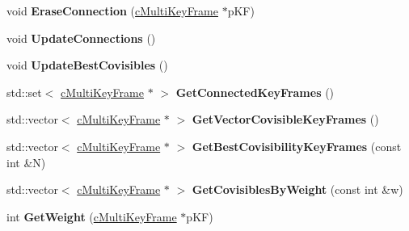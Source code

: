 \begin{DoxyCompactItemize}
\item 
void {\bfseries Erase\+Connection} (\hyperlink{classMultiColSLAM_1_1cMultiKeyFrame}{c\+Multi\+Key\+Frame} $\ast$p\+KF)\hypertarget{classMultiColSLAM_1_1cMultiKeyFrame_af24a02f8718683276af1d08dceff3ba0}{}\label{classMultiColSLAM_1_1cMultiKeyFrame_af24a02f8718683276af1d08dceff3ba0}

\item 
void {\bfseries Update\+Connections} ()\hypertarget{classMultiColSLAM_1_1cMultiKeyFrame_a8b468d98f7e5eaf1b6d1ed23d82f7550}{}\label{classMultiColSLAM_1_1cMultiKeyFrame_a8b468d98f7e5eaf1b6d1ed23d82f7550}

\item 
void {\bfseries Update\+Best\+Covisibles} ()\hypertarget{classMultiColSLAM_1_1cMultiKeyFrame_a7e8be04b50f3972f16278ae5e69be13c}{}\label{classMultiColSLAM_1_1cMultiKeyFrame_a7e8be04b50f3972f16278ae5e69be13c}

\item 
std\+::set$<$ \hyperlink{classMultiColSLAM_1_1cMultiKeyFrame}{c\+Multi\+Key\+Frame} $\ast$ $>$ {\bfseries Get\+Connected\+Key\+Frames} ()\hypertarget{classMultiColSLAM_1_1cMultiKeyFrame_a98bb50a395b13972fee7483eb428f7c7}{}\label{classMultiColSLAM_1_1cMultiKeyFrame_a98bb50a395b13972fee7483eb428f7c7}

\item 
std\+::vector$<$ \hyperlink{classMultiColSLAM_1_1cMultiKeyFrame}{c\+Multi\+Key\+Frame} $\ast$ $>$ {\bfseries Get\+Vector\+Covisible\+Key\+Frames} ()\hypertarget{classMultiColSLAM_1_1cMultiKeyFrame_abb15651bcb2f8ea2b5a37d92b3b8cd56}{}\label{classMultiColSLAM_1_1cMultiKeyFrame_abb15651bcb2f8ea2b5a37d92b3b8cd56}

\item 
std\+::vector$<$ \hyperlink{classMultiColSLAM_1_1cMultiKeyFrame}{c\+Multi\+Key\+Frame} $\ast$ $>$ {\bfseries Get\+Best\+Covisibility\+Key\+Frames} (const int \&N)\hypertarget{classMultiColSLAM_1_1cMultiKeyFrame_aca2e8582f01b60bebcfb21dabd358889}{}\label{classMultiColSLAM_1_1cMultiKeyFrame_aca2e8582f01b60bebcfb21dabd358889}

\item 
std\+::vector$<$ \hyperlink{classMultiColSLAM_1_1cMultiKeyFrame}{c\+Multi\+Key\+Frame} $\ast$ $>$ {\bfseries Get\+Covisibles\+By\+Weight} (const int \&w)\hypertarget{classMultiColSLAM_1_1cMultiKeyFrame_a5e22f9516ec2c78db002b56b88c73b80}{}\label{classMultiColSLAM_1_1cMultiKeyFrame_a5e22f9516ec2c78db002b56b88c73b80}

\item 
int {\bfseries Get\+Weight} (\hyperlink{classMultiColSLAM_1_1cMultiKeyFrame}{c\+Multi\+Key\+Frame} $\ast$p\+KF)\hypertarget{classMultiColSLAM_1_1cMultiKeyFrame_a5007a6c129aa970256493b2574a5ca49}{}\label{classMultiColSLAM_1_1cMultiKeyFrame_a5007a6c129aa970256493b2574a5ca49}


\end{DoxyCompactItemize}
